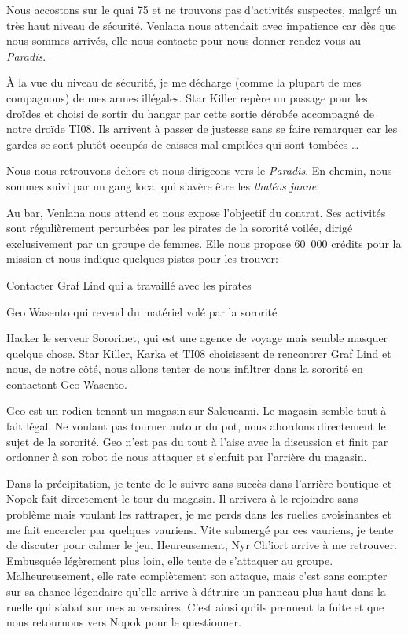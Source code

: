 \documentclass[a4paper,9pt,twoside,twocolumn,openany]{book}
\begin{document}
Nous accostons sur le quai 75 et ne trouvons pas d’activités suspectes, malgré un très haut niveau de sécurité. Venlana nous attendait avec impatience car dès que nous sommes arrivés, elle nous contacte pour nous donner rendez-vous au \emph{Paradis}.

À la vue du niveau de sécurité, je me décharge (comme la plupart de mes compagnons) de mes armes illégales. Star Killer repère un passage pour les droïdes et choisi de sortir du hangar par cette sortie dérobée accompagné de notre droïde TI08. Ils arrivent à passer de justesse sans se faire remarquer car les gardes se sont plutôt occupés de caisses mal empilées qui sont tombées …

Nous nous retrouvons dehors et nous dirigeons vers le \emph{Paradis}. En chemin, nous sommes suivi par un gang local qui s’avère être les \emph{thaléos jaune}.

Au bar, Venlana nous attend et nous expose l’objectif du contrat. Ses activités sont régulièrement perturbées par les pirates de la sororité  voilée, dirigé exclusivement par un groupe de femmes. Elle nous propose 60\ 000 crédits pour la mission et nous indique quelques pistes pour les trouver:

Contacter Graf Lind qui a travaillé avec les pirates

Geo Wasento qui revend du matériel volé par la sororité

Hacker le serveur Sororinet, qui est une agence de voyage mais semble masquer quelque chose.
Star Killer, Karka et TI08 choisissent de rencontrer Graf Lind et nous, de notre côté, nous allons tenter de nous infiltrer dans la sororité en contactant Geo Wasento.

Geo est un rodien tenant un magasin sur Saleucami. Le magasin semble tout à fait légal. Ne voulant pas tourner autour du pot, nous abordons directement le sujet de la sororité. Geo n’est pas du tout à l’aise avec la discussion et finit par ordonner à son robot de nous attaquer et s’enfuit par l’arrière du magasin.

Dans la précipitation, je tente de le suivre sans succès dans l’arrière-boutique et Nopok fait directement le tour du magasin. Il arrivera à le rejoindre sans problème mais voulant les rattraper, je me perds dans les ruelles avoisinantes et me fait encercler par quelques vauriens.
Vite submergé par ces vauriens, je tente de discuter pour calmer le jeu. Heureusement, Nyr Ch'iort arrive à me retrouver. Embusquée légèrement plus loin, elle tente de s’attaquer au groupe. Malheureusement, elle rate complètement son attaque, mais c’est sans compter sur sa chance légendaire qu’elle arrive à détruire un panneau plus haut dans la ruelle qui s’abat sur mes adversaires. C’est ainsi qu’ils prennent la fuite et que nous retournons vers Nopok pour le questionner.
\end{document}

